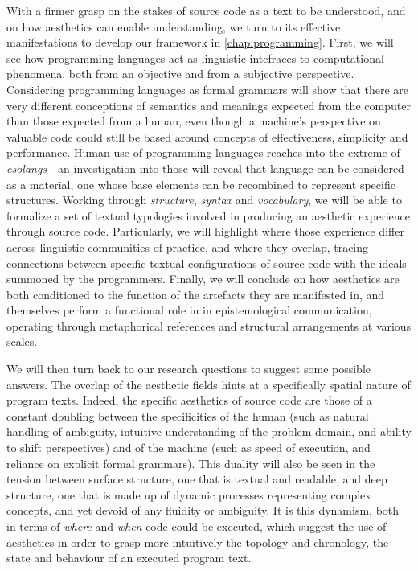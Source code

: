 With a firmer grasp on the stakes of source code as a text to be understood, and on how aesthetics can enable understanding, we turn to its effective manifestations to develop our framework in \ref{chap:programming}. First, we will see how programming languages act as linguistic intefraces to computational phenomena, both from an objective and from a subjective perspective. Considering programming languages as formal grammars will show that there are very different conceptions of semantics and meanings expected from the computer than those expected from a human, even though a machine's perspective on valuable code could still be based around concepts of effectiveness, simplicity and performance. Human use of programming languages reaches into the extreme of \emph{esolangs}—an investigation into those will reveal that language can be considered as a material, one whose base elements can be recombined to represent specific structures. Working through \emph{structure}, \emph{syntax} and \emph{vocabulary}, we will be able to formalize a set of textual typologies involved in producing an aesthetic experience through source code. Particularly, we will highlight where those experience differ across linguistic communities of practice, and where they overlap, tracing connections between specific textual configurations of source code with the ideals summoned by the programmers. Finally, we will conclude on how aesthetics are both conditioned to the function of the artefacts they are manifested in, and themselves perform a functional role in in epistemological communication, operating through metaphorical references and structural arrangements at various scales.

We will then turn back to our research questions to suggest some possible answers. The overlap of the aesthetic fields hints at a specifically spatial nature of program texts. Indeed, the specific aesthetics of source code are those of a constant doubling between the specificities of the human (such as natural handling of ambiguity, intuitive understanding of the problem domain, and ability to shift perspectives) and of the machine (such as speed of execution, and reliance on explicit formal grammars). This duality will also be seen in the tension between surface structure, one that is textual and readable, and deep structure, one that is made up of dynamic processes representing complex concepts, and yet devoid of any fluidity or ambiguity. It is this dynamism, both in terms of \emph{where} and \emph{when} code could be executed, which suggest the use of aesthetics in order to grasp more intuitively the topology and chronology, the state and behaviour of an executed program text.

